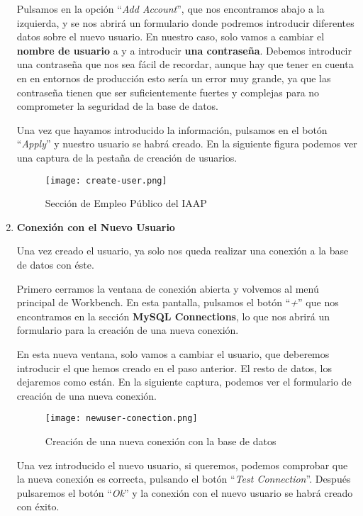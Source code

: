 \begin{enumerate}
    Pulsamos en la opción ``\textit{Add Account}'', que nos encontramos abajo a la izquierda, y se nos abrirá un formulario donde podremos introducir diferentes datos sobre el nuevo usuario. En nuestro caso, solo vamos a cambiar el \textbf{nombre de usuario} a y a introducir \textbf{una contraseña}. Debemos introducir una contraseña que nos sea fácil de recordar, aunque hay que tener en cuenta en en entornos de producción esto sería un error muy grande, ya que las contraseña tienen que ser suficientemente fuertes y complejas para no comprometer la seguridad de la base de datos.

    Una vez que hayamos introducido la información, pulsamos en el botón ``\textit{Apply}'' y nuestro usuario se habrá creado. En la siguiente figura podemos ver una captura de la pestaña de creación de usuarios.

    \newpage

    \begin{figure}[ht]
        \centering
        \texttt{[image: create-user.png]}
        \caption{Sección de Empleo Público del IAAP}
        \label{fig:create}
    \end{figure}

    \item \textbf{Conexión con el Nuevo Usuario}

    Una vez creado el usuario, ya solo nos queda realizar una conexión a la base de datos con éste.

    Primero cerramos la ventana de conexión abierta y volvemos al menú principal de Workbench. En esta pantalla, pulsamos el botón ``\textit{+}'' que nos encontramos en la sección \textbf{MySQL Connections}, lo que nos abrirá un formulario para la creación de una nueva conexión.

    En esta nueva ventana, solo vamos a cambiar el usuario, que deberemos introducir el que hemos creado en el paso anterior. El resto de datos, los dejaremos como están. En la siguiente captura, podemos ver el formulario de creación de una nueva conexión.

   \begin{figure}[ht]
        \centering
        \texttt{[image: newuser-conection.png]}
        \caption{Creación de una nueva conexión con la base de datos}
    \end{figure}

    Una vez introducido el nuevo usuario, si queremos, podemos comprobar que la nueva conexión es correcta, pulsando el botón ``\textit{Test Connection}''. Después pulsaremos el botón ``\textit{Ok}'' y la conexión con el nuevo usuario se habrá creado con éxito.
\end{enumerate}

